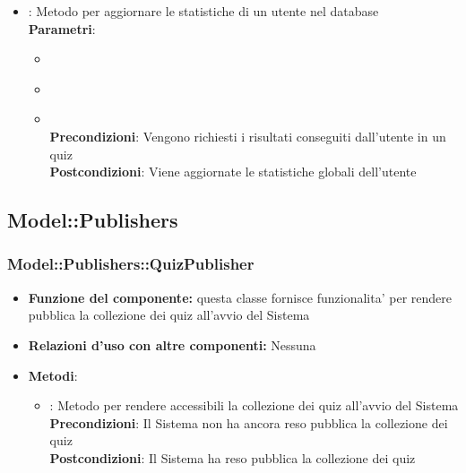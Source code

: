 \begin{itemize}
\begin{itemize}
\begin{itemize}
	\end{itemize}
	\item{} : Metodo per aggiornare le statistiche di un utente nel database\\
	\textbf{Parametri}:
	\begin{itemize}
		\item{}\\
		\item{}\\
		\item{}\\
		\textbf{Precondizioni}: Vengono richiesti i risultati conseguiti dall'utente in un quiz\\
		\textbf{Postcondizioni}: Viene aggiornate le statistiche globali dell'utente\\
	\end{itemize}
\end{itemize}
\end{itemize}

\subsection{Model::Publishers}
\subsubsection{Model::Publishers::QuizPublisher}
\begin{itemize}
\item\textbf{Funzione del componente:} questa classe fornisce funzionalita' per rendere pubblica la collezione dei quiz all'avvio del Sistema
\item\textbf{Relazioni d'uso con altre componenti:} Nessuna \\
\item\textbf{Metodi}:
	\begin{itemize}
		\item{} : Metodo per rendere accessibili la collezione dei quiz all'avvio del Sistema\\
		\textbf{Precondizioni}: Il Sistema non ha ancora reso pubblica la collezione dei quiz\\
		\textbf{Postcondizioni}: Il Sistema ha reso pubblica la collezione dei quiz\\
	\end{itemize}
\end{itemize}

